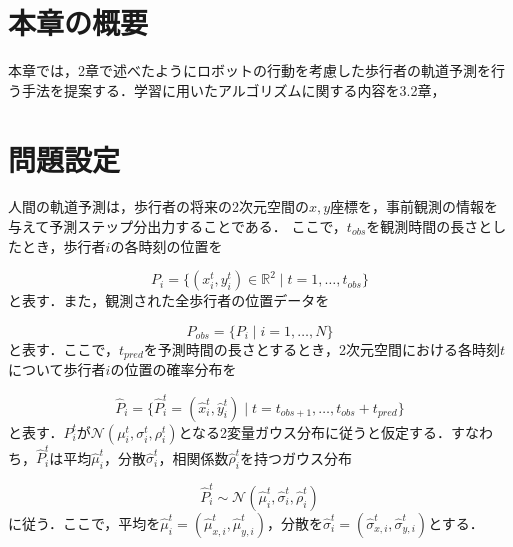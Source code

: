 
\section{本章の概要}

本章では，2章で述べたようにロボットの行動を考慮した歩行者の軌道予測を行う手法を提案する．学習に用いたアルゴリズムに関する内容を3.2章，



\section{問題設定}


人間の軌道予測は，歩行者の将来の2次元空間の$x,y$座標を，事前観測の情報を与えて予測ステップ分出力することである．
ここで，$t_{obs}$を観測時間の長さとしたとき，歩行者$i$の各時刻の位置を

\begin{equation}
  P_i = \{ (x^t_i, y^t_i) \in \mathbb{R}^2 \mid t = 1, \dots , t_{obs} \}
\end{equation}
と表す．また，観測された全歩行者の位置データを

\begin{equation}
  P_{obs} = \{ P_i \mid i = 1, \dots , N \}  
\end{equation}
と表す．ここで，$t_{pred}$を予測時間の長さとするとき，2次元空間における各時刻$t$について歩行者$i$の位置の確率分布を

\begin{equation}
  \hat{P}_i = \{ \hat{P}^t_i = (\hat{x}^t_i, \hat{y}^t_i) \mid t = t_{obs + 1}, \dots , t_{obs} + t_{pred} \} \label{hat-pos}
\end{equation}
と表す．$P^t_i$が$\mathcal{N}(\mu^t_i, \sigma^t_i, \rho^t_i)$となる2変量ガウス分布に従うと仮定する．すなわち，$\hat{P}^t_i$は平均$\hat{\mu}^t_i$，分散$\hat{\sigma}^t_i$，相関係数$\hat{\rho}^t_i$を持つガウス分布

\begin{equation}
  \hat{P}^t_i \sim \mathcal{N}(\hat{\mu}^t_i, \hat{\sigma}^t_i, \hat{\rho}^t_i)
\end{equation}
に従う．ここで，平均を$\hat{\mu}^t_i = (\hat{\mu}^t_{x, i}, \hat{\mu}^t_{y, i})$，分散を$\hat{\sigma}^t_i = (\hat{\sigma}^t_{x, i}, \hat{\sigma}^t_{y, i})$とする．

